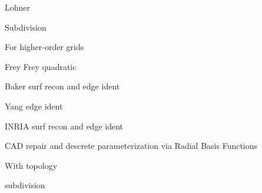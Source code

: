 \documentclass{article}
\begin{document}
Lohner\cite{lohner-regridding-surface}
\cite{kim-takano-nakahashi-adjoint-adapt,kim-nakahashi-adjoint-adapt-viscous}

Subdivision\cite{haimes-imr15-subdivision}

For higher-order grids\cite{unstruct-3d-ho-grid-dg-surf-recon}
\cite{jiao-wang-resonstruct-ho-surf}

Frey\cite{frey-imr9-about-surface-remeshing}
Frey quadratic\cite{dapogny-dobrzynski-frey-3d-adapt-surf-recon}

Baker surf recon and edge ident\cite{baker-imr13}

Yang edge ident\cite{yang-zheng-wang-joint-line-detection-tri}

INRIA surf recon and edge ident\cite{borouchaki-surface-reconstruction}

CAD repair and descrete parameterization via Radial Basis Functions
\cite{cad-repair-discrete-param-rbf}

With topology\cite{lepage-habashi-cad-reconstruction}

subdivision\cite{haimes-imr15-subdivision}




\end{document}
